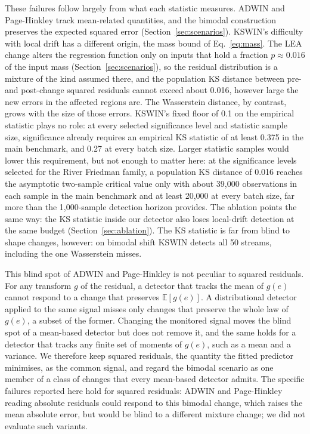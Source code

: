 \documentclass[preprint,12pt]{elsarticle}
\begin{document}
These failures follow largely from what each statistic measures. ADWIN and Page-Hinkley track mean-related quantities, and the bimodal construction preserves the expected squared error (Section~\ref{sec:scenarios}). KSWIN's difficulty with local drift has a different origin, the mass bound of Eq.~\eqref{eq:mass}. The LEA change alters the regression function only on inputs that hold a fraction $p\approx0.016$ of the input mass (Section~\ref{sec:scenarios}), so the residual distribution is a mixture of the kind assumed there, and the population KS distance between pre- and post-change squared residuals cannot exceed about 0.016, however large the new errors in the affected regions are. The Wasserstein distance, by contrast, grows with the size of those errors. KSWIN's fixed floor of 0.1 on the empirical statistic plays no role: at every selected significance level and statistic sample size, significance already requires an empirical KS statistic of at least 0.375 in the main benchmark, and 0.27 at every batch size. Larger statistic samples would lower this requirement, but not enough to matter here: at the significance levels selected for the River Friedman family, a population KS distance of 0.016 reaches the asymptotic two-sample critical value only with about 39,000 observations in each sample in the main benchmark and at least 20,000 at every batch size, far more than the 1,000-sample detection horizon provides. The ablation points the same way: the KS statistic inside our detector also loses local-drift detection at the same budget (Section~\ref{sec:ablation}). The KS statistic is far from blind to shape changes, however: on bimodal shift KSWIN detects all 50 streams, including the one Wasserstein misses.

This blind spot of ADWIN and Page-Hinkley is not peculiar to squared residuals. For any transform $g$ of the residual, a detector that tracks the mean of $g(e)$ cannot respond to a change that preserves $\mathbb E[g(e)]$. A distributional detector applied to the same signal misses only changes that preserve the whole law of $g(e)$, a subset of the former. Changing the monitored signal moves the blind spot of a mean-based detector but does not remove it, and the same holds for a detector that tracks any finite set of moments of $g(e)$, such as a mean and a variance. We therefore keep squared residuals, the quantity the fitted predictor minimises, as the common signal, and regard the bimodal scenario as one member of a class of changes that every mean-based detector admits. The specific failures reported here hold for squared residuals: ADWIN and Page-Hinkley reading absolute residuals could respond to this bimodal change, which raises the mean absolute error, but would be blind to a different mixture change; we did not evaluate such variants.
\end{document}
